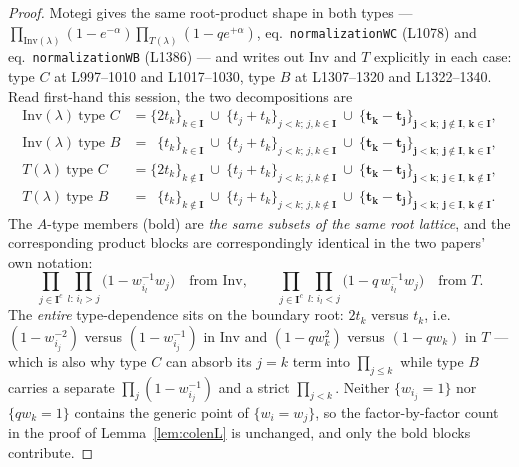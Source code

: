 \documentclass[11pt]{article}
\theoremstyle{plain}
\theoremstyle{definition}
\theoremstyle{remark}
\theoremstyle{plain}
\newcommand{\bI}{\mathbf{I}}
\begin{document}
\begin{proof}
Motegi gives the same root-product shape in both types ---
$\prod_{\mathrm{Inv}(\lambda)}(1-e^{-\alpha})\prod_{T(\lambda)}(1-qe^{+\alpha})$,
eq.\ \texttt{normalizationWC} (L1078) and eq.\ \texttt{normalizationWB} (L1386)
--- and writes out $\mathrm{Inv}$ and $T$ explicitly in each case: type $C$ at
L997--1010 and L1017--1030, type $B$ at L1307--1320 and L1322--1340.  Read
first-hand this session, the two decompositions are
\begin{align*}
\mathrm{Inv}(\lambda)\ \text{type }C &=
   \{2t_k\}_{k\in\bI}\ \cup\ \{t_j{+}t_k\}_{j<k;\,j,k\in\bI}\ \cup\
   \mathbf{\{t_k{-}t_j\}_{j<k;\ j\notin\bI,\,k\in\bI}}, \\
\mathrm{Inv}(\lambda)\ \text{type }B &=
   \phantom{2}\{t_k\}_{k\in\bI}\ \cup\ \{t_j{+}t_k\}_{j<k;\,j,k\in\bI}\ \cup\
   \mathbf{\{t_k{-}t_j\}_{j<k;\ j\notin\bI,\,k\in\bI}}, \\[1mm]
T(\lambda)\ \text{type }C &=
   \{2t_k\}_{k\notin\bI}\ \cup\ \{t_j{+}t_k\}_{j<k;\,j,k\notin\bI}\ \cup\
   \mathbf{\{t_k{-}t_j\}_{j<k;\ j\in\bI,\,k\notin\bI}}, \\
T(\lambda)\ \text{type }B &=
   \phantom{2}\{t_k\}_{k\notin\bI}\ \cup\ \{t_j{+}t_k\}_{j<k;\,j,k\notin\bI}\ \cup\
   \mathbf{\{t_k{-}t_j\}_{j<k;\ j\in\bI,\,k\notin\bI}}.
\end{align*}
The $A$-type members (bold) are \emph{the same subsets of the same root lattice},
and the corresponding product blocks are correspondingly identical in the two
papers' own notation:
\[
  \prod_{j\in\bI^{c}}\prod_{l:\,i_l>j}\bigl(1-w_{i_l}^{-1}w_j\bigr)
  \quad\text{from }\mathrm{Inv},
  \qquad
  \prod_{j\in\bI^{c}}\prod_{l:\,i_l<j}\bigl(1-q\,w_{i_l}^{-1}w_j\bigr)
  \quad\text{from }T .
\]
The \emph{entire} type-dependence sits on the boundary root: $2t_k$ versus
$t_k$, i.e.\ $(1-w_{i_j}^{-2})$ versus $(1-w_{i_j}^{-1})$ in $\mathrm{Inv}$ and
$(1-qw_k^2)$ versus $(1-qw_k)$ in $T$ --- which is also why type $C$ can absorb
its $j=k$ term into $\prod_{j\le k}$ while type $B$ carries a separate
$\prod_j(1-w_{i_j}^{-1})$ and a strict $\prod_{j<k}$.  Neither
$\{w_{i_j}=1\}$ nor $\{qw_k=1\}$ contains the generic point of $\{w_i=w_j\}$, so
the factor-by-factor count in the proof of Lemma~\ref{lem:colenL} is unchanged,
and only the bold blocks contribute.
\end{proof}
\end{document}
